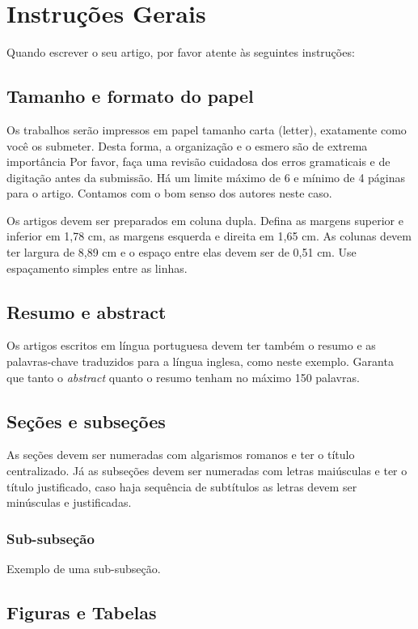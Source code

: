 \section{Instruções Gerais}
Quando escrever o seu artigo, por favor atente às seguintes instruções:

\subsection{Tamanho e formato do papel}
Os trabalhos serão impressos em papel tamanho carta (letter), exatamente como você os submeter. Desta forma, a organização e o esmero são de extrema importância Por favor, faça uma revisão cuidadosa dos erros gramaticais e de digitação antes da submissão. Há um limite máximo de 6 e mínimo de 4 páginas para o artigo. Contamos com o bom senso dos autores neste caso.

Os artigos devem ser preparados em coluna dupla. Defina as margens superior e inferior em 1,78 cm, as margens esquerda e direita em 1,65 cm. As colunas devem ter largura de 8,89 cm e o espaço entre elas devem ser de 0,51 cm. Use espaçamento simples entre as linhas.

\subsection{Resumo e abstract}
Os artigos escritos em língua portuguesa devem ter também o resumo e as palavras-chave traduzidos para a língua inglesa, como neste exemplo. Garanta que tanto o \textit{abstract} quanto o resumo tenham no máximo 150 palavras.

\subsection{Seções e subseções}
As seções devem ser numeradas com algarismos romanos e ter o título centralizado. Já as subseções devem ser numeradas com letras maiúsculas e ter o título justificado, caso haja sequência de subtítulos as letras devem ser minúsculas e justificadas. 

\subsubsection{Sub-subseção}

Exemplo de uma sub-subseção.

\subsection{Figuras e Tabelas}

